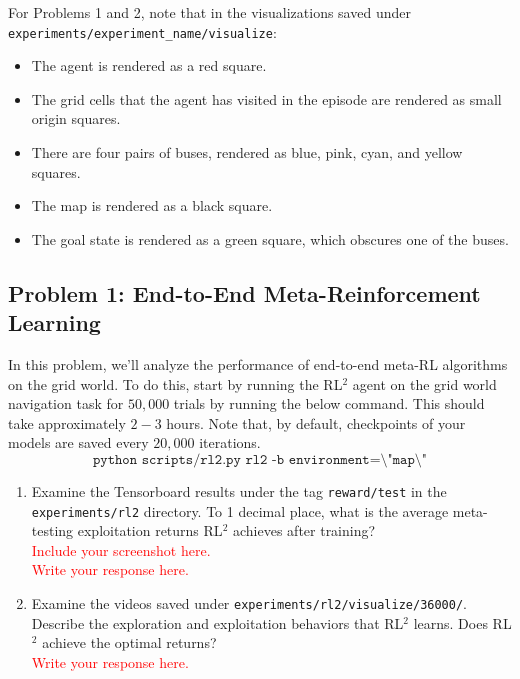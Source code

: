 \documentclass[12pt]{article}
\newcommand{\rl}{{RL$^2$ }}
\begin{document}
For Problems 1 and 2, note that in the visualizations saved under \linebreak \texttt{experiments/experiment\_name/visualize}:
\begin{itemize}
    \item The agent is rendered as a red square.
    \item The grid cells that the agent has visited in the episode are rendered as small origin squares.
    \item There are four pairs of buses, rendered as blue, pink, cyan, and yellow squares.
    \item The map is rendered as a black square.
    \item The goal state is rendered as a green square, which obscures one of the buses.
\end{itemize}

\subsection*{Problem 1: End-to-End Meta-Reinforcement Learning}

In this problem, we'll analyze the performance of end-to-end meta-RL algorithms on the grid world. To do this, start by running the \rl agent on the grid world navigation task for $50,000$ trials by running the below command. This should take approximately $2-3$ hours. Note that, by default, checkpoints of your models are saved every $20,000$ iterations. 
\begin{equation*}
    \texttt{python scripts/rl2.py rl2 -b environment=\textbackslash"map\textbackslash"}
\end{equation*}

\begin{enumerate}
    \item Examine the Tensorboard results under the tag \texttt{reward/test} in the \texttt{experiments/rl2} directory. To 1 decimal place, what is the average meta-testing exploitation returns \rl achieves after training? \\
    \textcolor{red}{Include your screenshot here.} \\
    \textcolor{red}{Write your response here.}
    \item Examine the videos saved under \texttt{experiments/rl2/visualize/36000/}. Describe the exploration and exploitation behaviors that \rl learns. Does \rl achieve the optimal returns? \\
    \textcolor{red}{Write your response here.}
\end{enumerate}
\end{document}
